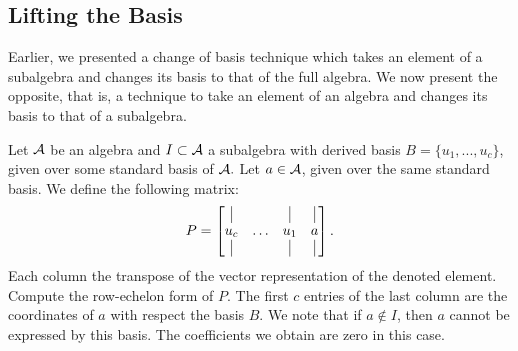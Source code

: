 \documentclass[../thesis.tex]{subfiles}
\begin{document}
\subsection{Lifting the Basis}\label{sec:RaisingTheBasis}
Earlier, we presented a change of basis technique which takes an element of a subalgebra and changes its basis to that of the full algebra. We now present the opposite, that is, a technique to take an element of an algebra and changes its basis to that of a subalgebra. 

Let $\mathcal{A}$ be an algebra and $I\subset\mathcal{A}$ a subalgebra with derived basis $B=\{u_1,...,u_c\}$, given over some standard basis of $\mathcal{A}.$ Let $a\in\mathcal{A}$, given over the same standard basis. We define the following matrix:
\begin{equation}\label{eq:RaisingTheBasis}
    P = \begin{bmatrix}
        \vline & &\vline &\vline\\
        u_c & \hdots & u_1 & a\\
        \vline & &\vline &\vline
    \end{bmatrix}.
\end{equation}
Each column the transpose of the vector representation of the denoted element. Compute the row-echelon form of $P$. The first $c$ entries of the last column are the coordinates of $a$ with respect the basis $B$. We note that if $a\nin I$, then $a$ cannot be expressed by this basis. The coefficients we obtain are zero in this case.
\end{document}
